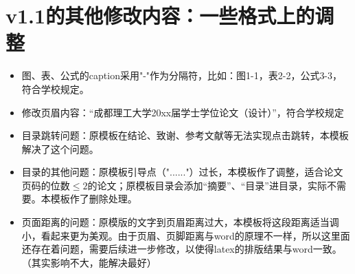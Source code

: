 \section{v1.1的其他修改内容：一些格式上的调整}
\begin{itemize}
	\item 图、表、公式的caption采用"-"作为分隔符，比如：图1-1，表2-2，公式3-3，符合学校规定。
	\item 修改页眉内容：“成都理工大学20xx届学士学位论文（设计）”，符合学校规定
	\item 目录跳转问题：原模板在结论、致谢、参考文献等无法实现点击跳转，本模板解决了这个问题。
	\item 目录的其他问题：原模板引导点（"......"）过长，本模板作了调整，适合论文页码的位数$\le2$的论文；原模板目录会添加“摘要”、“目录”进目录，实际不需要。本模板作了删除处理。
	\item 页面距离的问题：原模版的文字到页眉距离过大，本模板将这段距离适当调小，看起来更为美观。由于页眉、页脚距离与word的原理不一样，所以这里面还存在着问题，需要后续进一步修改，以使得latex的排版结果与word一致。（其实影响不大，能解决最好）
	
\end{itemize}